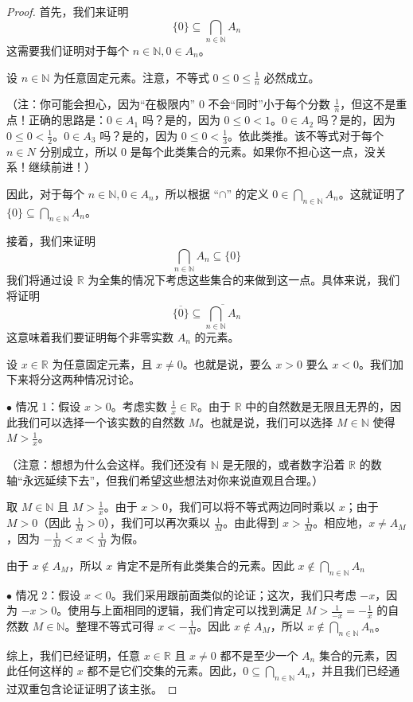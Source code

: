 \begin{proof}
    首先，我们来证明
    \[\{0\} \subseteq \bigcap_{n \in \mathbb{N}}A_n\]
    这需要我们证明对于每个 $n \in \mathbb{N}, 0 \in A_n$。

    设 $n \in \mathbb{N}$ 为任意固定元素。注意，不等式 $0 \le 0 \le \frac{1}{n}$ 必然成立。

    （注：你可能会担心，因为``在极限内'' $0$ 不会``同时''小于每个分数 $\frac{1}{n}$，但这不是重点！正确的思路是：$0 \in A_1$ 吗？是的，因为 $0 \le 0 < 1$。$0 \in A_2$ 吗？是的，因为 $0 \le 0 < \frac{1}{2}$。$0 \in A_3$ 吗？是的，因为 $0 \le 0 < \frac{1}{3}$。依此类推。该不等式对于每个 $n \in N$ 分别成立，所以 $0$ 是每个此类集合的元素。如果你不担心这一点，没关系！继续前进！）

    因此，对于每个 $n \in \mathbb{N}, 0 \in A_n$，所以根据 ``$\cap$'' 的定义 $\displaystyle{0 \in \bigcap_{n \in \mathbb{N}} A_n}$。这就证明了 $\displaystyle{\{0\} \subseteq \bigcap_{n \in \mathbb{N}} A_n}$。

    接着，我们来证明
    \[\bigcap_{n \in \mathbb{N}}A_n \subseteq \{0\}\]
    我们将通过设 $\mathbb{R}$ 为全集的情况下考虑这些集合的来做到这一点。具体来说，我们将证明
    \[\overline{\{0\}} \subseteq \overline{\bigcap_{n \in \mathbb{N}}A_n}\]
    这意味着我们要证明每个非零实数 $A_n$ 的元素。

    设 $x \in \mathbb{R}$ 为任意固定元素，且 $x \ne 0$。也就是说，要么 $x > 0$ 要么 $x < 0$。我们加下来将分这两种情况讨论。

    $\bullet$ 情况 1：假设 $x > 0$。考虑实数 $\frac{1}{x} \in \mathbb{R}$。由于 $\mathbb{R}$ 中的自然数是无限且无界的，因此我们可以选择一个该实数的自然数 $M$。也就是说，我们可以选择 $M \in \mathbb{N}$ 使得 $M > \frac{1}{x}$。

    （注意：想想为什么会这样。我们还没有 $\mathbb{N}$ 是无限的，或者数字沿着 $\mathbb{R}$ 的数轴``永远延续下去''，但我们希望这些想法对你来说直观且合理。）

    取 $M \in \mathbb{N}$ 且 $M > \frac{1}{x}$。由于 $x > 0$，我们可以将不等式两边同时乘以 $x$；由于 $M > 0$（因此 $\frac{1}{M} > 0$），我们可以再次乘以 $\frac{1}{M}$。由此得到 $x > \frac{1}{M}$。相应地，$x \ne A_M$，因为 $-\frac{1}{M} < x < \frac{1}{M}$ 为假。

    由于 $x \notin A_M$，所以 $x$ 肯定不是所有此类集合的元素。因此 $\displaystyle{x \notin \bigcap_{n \in \mathbb{N}} A_n}$

    $\bullet$ 情况 2：假设 $x < 0$。我们采用跟前面类似的论证；这次，我们只考虑 $-x$，因为 $-x > 0$。使用与上面相同的逻辑，我们肯定可以找到满足 $M > \frac{1}{-x} = -\frac{1}{x}$ 的自然数 $M \in \mathbb{N}$。整理不等式可得 $x < -\frac{1}{M}$。因此 $x \notin A_M$，所以 $\displaystyle{x \notin \bigcap_{n \in \mathbb{N}} A_n}$。

    综上，我们已经证明，任意 $x \in \mathbb{R}$ 且 $x \ne 0$ 都不是至少一个 $A_n$ 集合的元素，因此任何这样的 $x$ 都不是它们交集的元素。因此，$\displaystyle{{0} \subseteq \bigcap_{n \in \mathbb{N}} A_n}$，并且我们已经通过双重包含论证证明了该主张。
\end{proof}

